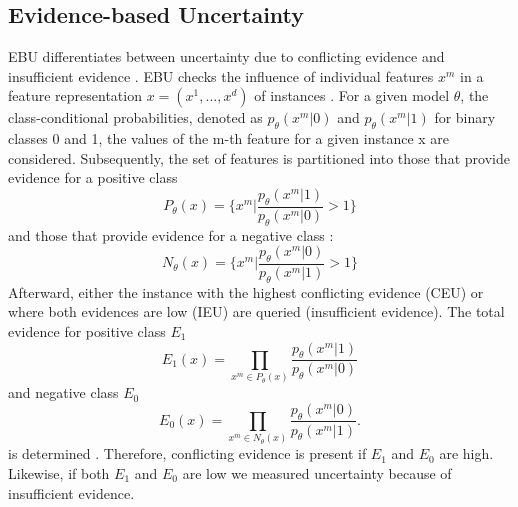 \subsection{Evidence-based Uncertainty} 
\label{subsec:evidence_based_uncertainty}
%
\Ac{EBU} differentiates between uncertainty due to conflicting evidence and insufficient evidence \cite{nguyen2021howtomeasure}.
\ac{EBU} checks the influence of individual features $x^m$ in a feature representation 
$x = (x^1,..., x^d)$ of instances \cite{nguyen2021howtomeasure}.
For a given model $\theta$, the class-conditional probabilities, denoted as $p_{\theta}(x^m |0)$ and $p_{\theta}(x^m | 1)$ for binary classes 0 and 1, the values of the m-th feature for a given instance x are considered.
Subsequently, the set of features is partitioned into those that provide evidence for a positive class
\begin{equation}
    P_{\theta}(x) = \bigg\{ x^m \bigg| \frac{p_{\theta}(x^m|1)}{p_{\theta}(x^m|0)} > 1 \bigg\} 
\end{equation}
and those that provide evidence for a negative class \cite{nguyen2021howtomeasure}:
 \begin{equation}
    N_{\theta}(x) = \bigg\{ x^m \bigg| \frac{p_{\theta}(x^m|0)}{p_{\theta}(x^m|1)} > 1 \bigg\} 
\end{equation}
Afterward, either the instance with the highest conflicting evidence (\ac{CEU}) or where both evidences are low (\ac{IEU}) are queried (insufficient evidence).
The total evidence for positive class $E_1$ 
\begin{equation}
    E_1(x) = \prod\limits_{x^m \in P_{\theta}(x)} \frac{p_{\theta}(x^m|1)}{p_{\theta}(x^m|0)}
\end{equation}
and negative class $E_0$
\begin{equation}
    E_0(x) = \prod\limits_{x^m \in N_{\theta}(x)} \frac{p_{\theta}(x^m|0)}{p_{\theta}(x^m|1)}.
\end{equation} 
is determined \cite{nguyen2021howtomeasure}.
Therefore, conflicting evidence is present if $E_1$ and $E_0$ are high.
Likewise, if both $E_1$ and $E_0$ are low we measured uncertainty because of insufficient evidence.
